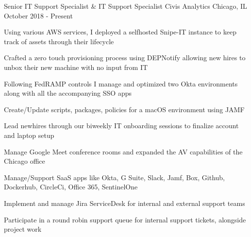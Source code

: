 

\begin{cventries}

	\cventry
	{Senior IT Support Specialist \& IT Support Specialist} %
	{Civis Analytics} %
	{Chicago, IL} %
	{October 2018 - Present} %
	{
		\begin{cvitems} %
			\item {Using various AWS services, I deployed a selfhosted Snipe-IT instance to keep track of assets through their lifecycle}
			\item {Crafted a zero touch provisioning process using DEPNotify allowing new hires to unbox their new machine with no input from IT}
			\item {Following FedRAMP controls I manage and optimized two Okta environments along with all the accompanying SSO apps}
			\item {Create/Update scripts, packages, policies for a macOS environment using JAMF}
			\item {Lead newhires through our biweekly IT onboarding sessions to finalize account and laptop setup}
			\item {Manage Google Meet conference rooms and expanded the AV capabilities of the Chicago office}
			\item {Manage/Support SaaS apps like Okta, G Suite, Slack, Jamf, Box, Github, Dockerhub, CircleCi, Office 365, SentinelOne}
			\item {Implement and manage Jira ServiceDesk for internal and external support teams}
			\item {Participate in a round robin support queue for internal support tickets, alongside project work}
		\end{cvitems}
	}


\end{cventries}
